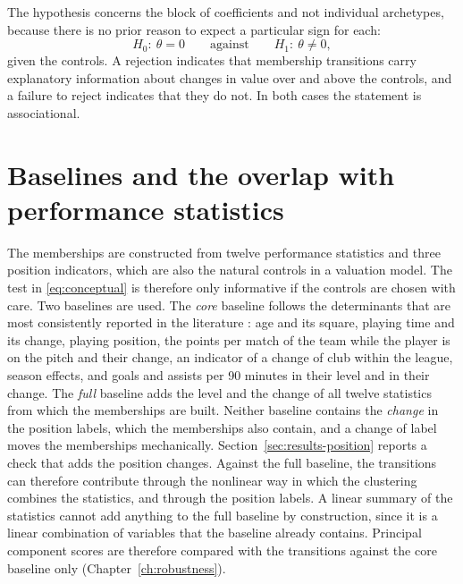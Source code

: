 The hypothesis concerns the block of coefficients and not individual archetypes, because there is no prior reason to expect a particular sign for each:
\begin{equation}
	H_0:\ \theta=0 \qquad\text{against}\qquad H_1:\ \theta\neq 0,
\end{equation}
given the controls. A rejection indicates that membership transitions carry explanatory information about changes in value over and above the controls, and a failure to reject indicates that they do not. In both cases the statement is associational.

\section{Baselines and the overlap with performance statistics}
\label{sec:theory-baselines}

The memberships are constructed from twelve performance statistics and three position indicators, which are also the natural controls in a valuation model. The test in \eqref{eq:conceptual} is therefore only informative if the controls are chosen with care. Two baselines are used. The \emph{core} baseline follows the determinants that are most consistently reported in the literature \cite{franceschi2024determinants}: age and its square, playing time and its change, playing position, the points per match of the team while the player is on the pitch and their change, an indicator of a change of club within the league, season effects, and goals and assists per 90 minutes in their level and in their change. The \emph{full} baseline adds the level and the change of all twelve statistics from which the memberships are built. Neither baseline contains the \emph{change} in the position labels, which the memberships also contain, and a change of label moves the memberships mechanically. Section~\ref{sec:results-position} reports a check that adds the position changes. Against the full baseline, the transitions can therefore contribute through the nonlinear way in which the clustering combines the statistics, and through the position labels. A linear summary of the statistics cannot add anything to the full baseline by construction, since it is a linear combination of variables that the baseline already contains. Principal component scores are therefore compared with the transitions against the core baseline only (Chapter~\ref{ch:robustness}).
